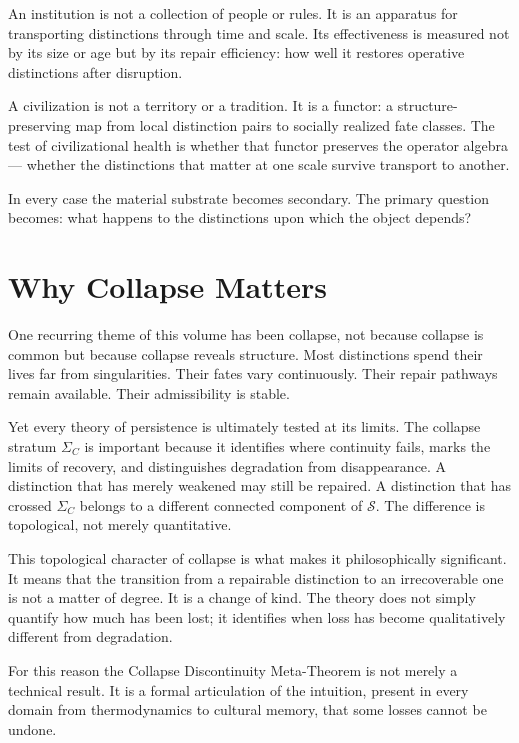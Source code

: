 \documentclass[12pt,twoside,openright]{book}
\newcommand{\fateSpace}{\mathcal{S}}
\newcommand{\strataC}{\Sigma_{C}}   %
\providecommand{\strataC}{\Sigma_{C}}
\begin{document}
An institution is not a collection of people or rules. It is
an apparatus for transporting distinctions through time and
scale. Its effectiveness is measured not by its size or age
but by its repair efficiency: how well it restores operative
distinctions after disruption.

A civilization is not a territory or a tradition. It is a
functor: a structure-preserving map from local distinction
pairs to socially realized fate classes. The test of
civilizational health is whether that functor preserves the
operator algebra --- whether the distinctions that matter at
one scale survive transport to another.

In every case the material substrate becomes secondary. The
primary question becomes: what happens to the distinctions upon
which the object depends?

\section{Why Collapse Matters}

One recurring theme of this volume has been collapse, not
because collapse is common but because collapse reveals
structure. Most distinctions spend their lives far from
singularities. Their fates vary continuously. Their repair
pathways remain available. Their admissibility is stable.

Yet every theory of persistence is ultimately tested at its
limits. The collapse stratum $\strataC$ is important because it
identifies where continuity fails, marks the limits of recovery,
and distinguishes degradation from disappearance. A distinction
that has merely weakened may still be repaired. A distinction
that has crossed $\strataC$ belongs to a different connected
component of $\fateSpace$. The difference is topological, not
merely quantitative.

This topological character of collapse is what makes it
philosophically significant. It means that the transition from
a repairable distinction to an irrecoverable one is not a
matter of degree. It is a change of kind. The theory does not
simply quantify how much has been lost; it identifies when
loss has become qualitatively different from degradation.

For this reason the Collapse Discontinuity Meta-Theorem is not
merely a technical result. It is a formal articulation of the
intuition, present in every domain from thermodynamics to
cultural memory, that some losses cannot be undone.
\end{document}
